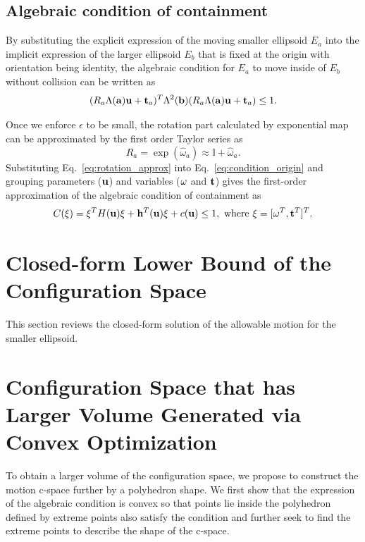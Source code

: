 \documentclass{article}
\begin{document}
\subsection{Algebraic condition of containment}
By substituting the explicit expression of the moving smaller ellipsoid $E_a$ into the implicit expression of the larger ellipsoid $E_b$ that is fixed at the origin with orientation being identity, the algebraic condition for $E_a$ to move inside of $E_b$ without collision can be written as
\begin{equation}
\label{eq:condition_origin}
(R_a \Lambda({\bf a}) {\bf u} + {\bf t}_a)^T \Lambda^2({\bf b}) (R_a \Lambda({\bf a}) {\bf u} + {\bf t}_a) \leq 1.
\end{equation}

Once we enforce $\epsilon$ to be small, the rotation part calculated by exponential map can be approximated by the first order Taylor series as
\begin{equation}
\label{eq:rotation_approx}
R_a = \exp(\hat{\omega}_a) \approx \mathbb{I} + \hat{\omega}_a.
\end{equation}
Substituting Eq.~\ref{eq:rotation_approx} into Eq.~\ref{eq:condition_origin} and grouping parameters (${\bf u}$) and variables (${\bf \omega}$ and ${\bf t}$) gives the first-order approximation of the algebraic condition of containment as
\begin{equation}
\label{eq:condition_approx}
C({\bf \xi}) = {\bf \xi}^T H({\bf u}) {\bf \xi} + {\bf h}^T({\bf u}) {\bf \xi} + c({\bf u}) \leq 1, \text{  where ${\bf \xi} = [{\bf \omega}^T, {\bf t}^T]^T$.}
\end{equation}


\section{Closed-form Lower Bound of the Configuration Space}
This section reviews the closed-form solution of the allowable motion for the smaller ellipsoid. 


\section{Configuration Space that has Larger Volume Generated via Convex Optimization}
To obtain a larger volume of the configuration space, we propose to construct the motion c-space further by a polyhedron shape. We first show that the expression of the algebraic condition is convex so that points lie inside the polyhedron defined by extreme points also satisfy the condition and further seek to find the extreme points to describe the shape of the c-space.
\end{document}
